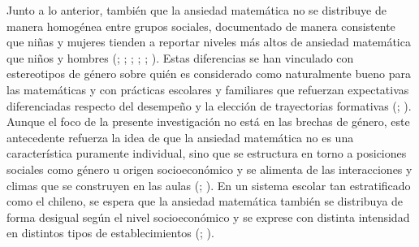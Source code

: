 \documentclass[
  spanish,
  a4paper,
  oneside]{scrbook}
\begin{document}
Junto a lo anterior, también que la ansiedad matemática no se distribuye
de manera homogénea entre grupos sociales, documentado de manera
consistente que niñas y mujeres tienden a reportar niveles más altos de
ansiedad matemática que niños y hombres (; ;
;
; ; ). Estas diferencias se han vinculado con estereotipos de género
sobre quién es considerado como naturalmente bueno para las matemáticas
y con prácticas escolares y familiares que refuerzan expectativas
diferenciadas respecto del desempeño y la elección de trayectorias
formativas (;
). Aunque el foco de la
presente investigación no está en las brechas de género, este
antecedente refuerza la idea de que la ansiedad matemática no es una
característica puramente individual, sino que se estructura en torno a
posiciones sociales como género u origen socioeconómico y se alimenta de
las interacciones y climas que se construyen en las aulas
(;
). En un sistema escolar tan
estratificado como el chileno, se espera que la ansiedad matemática
también se distribuya de forma desigual según el nivel socioeconómico y
se exprese con distinta intensidad en distintos tipos de
establecimientos (; ).
\end{document}
